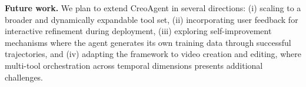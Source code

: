 \documentclass{article}
\begin{document}
\textbf{Future work.} We plan to extend CreoAgent in several directions: (i) scaling to a broader and dynamically expandable tool set, (ii) incorporating user feedback for interactive refinement during deployment, (iii) exploring self-improvement mechanisms where the agent generates its own training data through successful trajectories, and (iv) adapting the framework to video creation and editing, where multi-tool orchestration across temporal dimensions presents additional challenges.


% 
\end{document}
